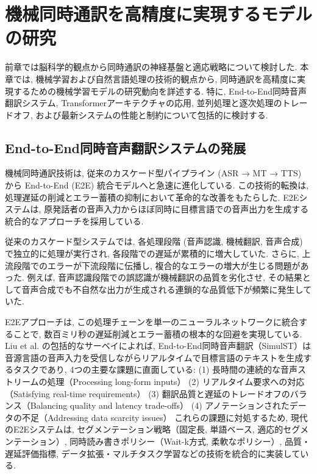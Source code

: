 \section{機械同時通訳を高精度に実現するモデルの研究}

前章では脳科学的観点から同時通訳の神経基盤と適応戦略について検討した.
本章では, 機械学習および自然言語処理の技術的観点から, 同時通訳を高精度に実現するための機械学習モデルの研究動向を詳述する.
特に, End-to-End同時音声翻訳システム, Transformerアーキテクチャの応用, 並列処理と逐次処理のトレードオフ, および最新システムの性能と制約について包括的に検討する.

\subsection{End-to-End同時音声翻訳システムの発展}

機械同時通訳技術は, 従来のカスケード型パイプライン (ASR → MT → TTS) から End-to-End (E2E) 統合モデルへと急速に進化している.
この技術的転換は, 処理遅延の削減とエラー蓄積の抑制において革命的な改善をもたらした.
E2Eシステムは, 原発話者の音声入力からほぼ同時に目標言語での音声出力を生成する統合的なアプローチを採用している.

従来のカスケード型システムでは, 各処理段階 (音声認識, 機械翻訳, 音声合成) で独立的に処理が実行され, 各段階での遅延が累積的に増大していた.
さらに, 上流段階でのエラーが下流段階に伝播し, 複合的なエラーの増大が生じる問題があった.
例えば, 音声認識段階での誤認識が機械翻訳の品質を劣化させ, その結果として音声合成でも不自然な出力が生成される連鎖的な品質低下が頻繁に発生していた.

E2Eアプローチは, この処理チェーンを単一のニューラルネットワークに統合することで, 数百ミリ秒の遅延削減とエラー蓄積の根本的な回避を実現している.
Liu et al. \cite{liu2024recent} の包括的なサーベイによれば, End-to-End同時音声翻訳（SimulST）は音源言語の音声入力を受信しながらリアルタイムで目標言語のテキストを生成するタスクであり, 4つの主要な課題に直面している:
(1) 長時間の連続的な音声ストリームの処理（Processing long-form inputs）
(2) リアルタイム要求への対応（Satisfying real-time requirements）
(3) 翻訳品質と遅延のトレードオフのバランス（Balancing quality and latency trade-offs）
(4) アノテーションされたデータの不足（Addressing data scarcity issues）
これらの課題に対処するため, 現代のE2Eシステムは, セグメンテーション戦略（固定長, 単語ベース, 適応的セグメンテーション）, 同時読み書きポリシー（Wait-k方式, 柔軟なポリシー）, 品質・遅延評価指標, データ拡張・マルチタスク学習などの技術を統合的に実装している.

